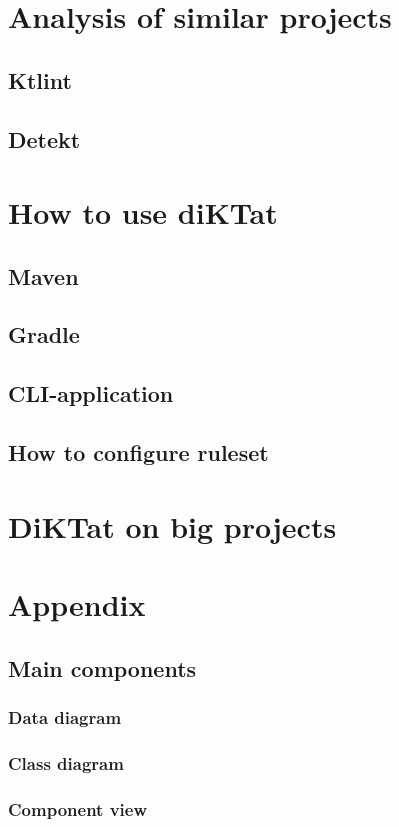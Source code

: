 \documentclass{article}
\begin{document}
\section{Analysis of similar projects}
\subsection{Ktlint}
\subsection{Detekt}
\newpage

\section{How to use diKTat}
\subsection{Maven}
\subsection{Gradle}
\subsection{CLI-application}
\subsection{How to configure ruleset}
\newpage

\section{DiKTat on big projects}

\newpage
\section{Appendix}
\subsection{Main components}
\subsubsection{Data diagram}
\subsubsection{Class diagram}
\subsubsection{Component view}
\end{document}
